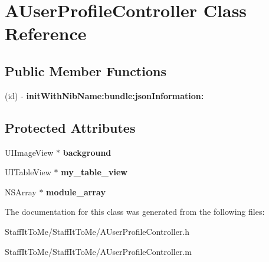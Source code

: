 \hypertarget{interface_a_user_profile_controller}{
\section{\-A\-User\-Profile\-Controller \-Class \-Reference}
\label{interface_a_user_profile_controller}
}
\subsection*{\-Public \-Member \-Functions}
\begin{DoxyCompactItemize}
\item 
\hypertarget{interface_a_user_profile_controller_ae234929fbd7e8bfb15aa5440a11ecd0b}{
(id) -\/ {\bfseries init\-With\-Nib\-Name\-:bundle\-:json\-Information\-:}}
\label{interface_a_user_profile_controller_ae234929fbd7e8bfb15aa5440a11ecd0b}

\end{DoxyCompactItemize}
\subsection*{\-Protected \-Attributes}
\begin{DoxyCompactItemize}
\item 
\hypertarget{interface_a_user_profile_controller_a7e270b645c06b0bf302b5ffd9b3a075f}{
\-U\-I\-Image\-View $\ast$ {\bfseries background}}
\label{interface_a_user_profile_controller_a7e270b645c06b0bf302b5ffd9b3a075f}

\item 
\hypertarget{interface_a_user_profile_controller_a53c1ae36d9b12d61352cb59ba85e6fb1}{
\-U\-I\-Table\-View $\ast$ {\bfseries my\-\_\-table\-\_\-view}}
\label{interface_a_user_profile_controller_a53c1ae36d9b12d61352cb59ba85e6fb1}

\item 
\hypertarget{interface_a_user_profile_controller_ad4d4f40ba1dbdc0bc9c3d56c3343a22a}{
\-N\-S\-Array $\ast$ {\bfseries module\-\_\-array}}
\label{interface_a_user_profile_controller_ad4d4f40ba1dbdc0bc9c3d56c3343a22a}

\end{DoxyCompactItemize}


\-The documentation for this class was generated from the following files\-:\begin{DoxyCompactItemize}
\item 
\-Staff\-It\-To\-Me/\-Staff\-It\-To\-Me/\-A\-User\-Profile\-Controller.\-h\item 
\-Staff\-It\-To\-Me/\-Staff\-It\-To\-Me/\-A\-User\-Profile\-Controller.\-m\end{DoxyCompactItemize}
